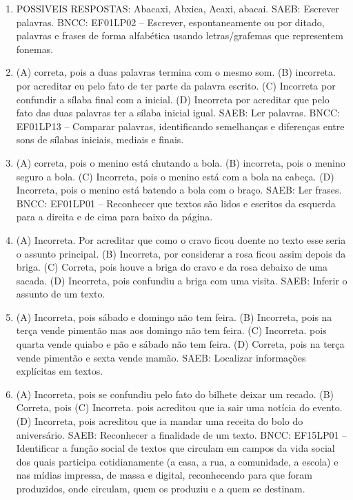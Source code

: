 \begin{enumerate}
\item
POSSIVEIS RESPOSTAS:
Abacaxi, Abxica, Acaxi, abacai.
SAEB: Escrever palavras.
BNCC: EF01LP02 -- Escrever, espontaneamente ou por ditado, palavras e frases de forma alfabética usando letras/grafemas que representem fonemas.

\item
(A) correta, pois a duas palavras termina com o mesmo som.
(B) incorreta. por acreditar eu pelo fato de ter parte da palavra escrito.
(C) Incorreta por confundir a sílaba final com a inicial.
(D) Incorreta por acreditar que pelo fato das duas palavras ter a sílaba inicial igual.
SAEB: Ler palavras.
BNCC: EF01LP13 -- Comparar palavras, identificando semelhanças e
diferenças entre sons de sílabas iniciais, mediais e finais.

\item
(A) correta, pois o menino está chutando a bola.
(B) incorreta, pois o menino seguro a bola.
(C) Incorreta, pois o menino está com a bola na cabeça.
(D) Incorreta, pois o menino está batendo a bola com o braço.
SAEB: Ler frases.
BNCC: EF01LP01 -- Reconhecer que textos são lidos e escritos da
esquerda para a direita e de cima para baixo da página.

\item
(A) Incorreta. Por acreditar que como o cravo ficou doente no texto esse seria o assunto principal.
(B) Incorreta, por considerar a rosa ficou assim depois da briga.
(C) Correta, pois houve a briga do cravo e da rosa debaixo de uma sacada.
(D) Incorreta, pois confundiu a briga com uma visita.
SAEB: Inferir o assunto de um texto.

\item
(A) Incorreta, pois sábado e domingo não tem feira.
(B) Incorreta, pois na terça vende pimentão mas aos domingo não tem feira.
(C) Incorreta. pois quarta vende quiabo e pão e sábado não tem feira.
(D) Correta, pois na terça vende pimentão e sexta vende mamão.
SAEB: Localizar informações explícitas em textos.

\item
(A) Incorreta, pois se confundiu pelo fato do bilhete deixar um recado.
(B) Correta, pois
(C) Incorreta. pois acreditou que ia sair uma notícia do evento.
(D) Incorreta, pois acreditou que ia mandar uma receita do bolo do aniversário.
SAEB: Reconhecer a finalidade de um texto.
BNCC: EF15LP01 -- Identificar a função social de textos que
circulam em campos da vida social dos quais participa cotidianamente (a
casa, a rua, a comunidade, a escola) e nas mídias impressa, de massa e
digital, reconhecendo para que foram produzidos, onde circulam, quem os
produziu e a quem se destinam.


\end{enumerate}
